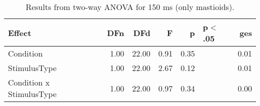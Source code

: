 \begin{table}[ht]
\centering
\begin{tabulary}{\textwidth}{lrrrrlr}
  \toprule
Effect & DFn & DFd & F & p & p$<$.05 & ges \\ 
  \midrule
Condition & 1.00 & 22.00 & 0.91 & 0.35 &  & 0.01 \\ 
  StimulusType & 1.00 & 22.00 & 2.67 & 0.12 &  & 0.01 \\ 
  Condition x StimulusType & 1.00 & 22.00 & 0.97 & 0.34 &  & 0.00 \\ 
   \bottomrule
\end{tabulary}
\caption{Results from two-way ANOVA for 150 ms (only mastioids).} 
\end{table}
